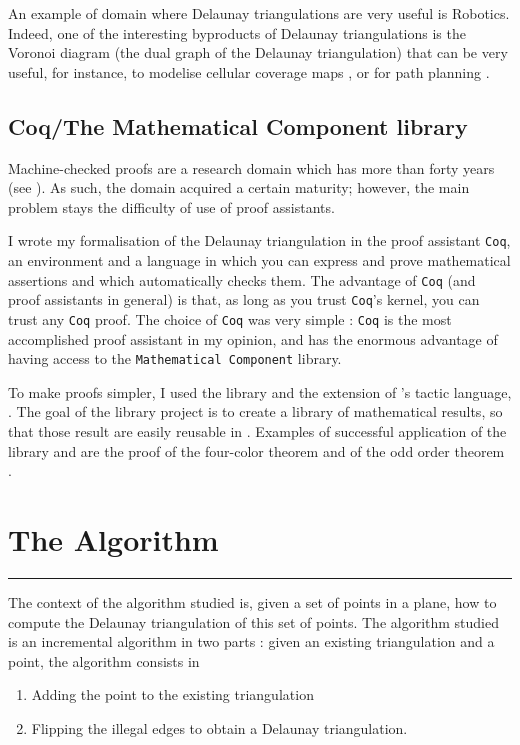 \documentclass[a4paper,10pt]{article}
\begin{document}
An example of domain where Delaunay triangulations are very useful is Robotics. Indeed, one of the interesting byproducts of Delaunay triangulations is the Voronoi diagram (the dual graph of the Delaunay triangulation) that can be very useful, for instance, to modelise cellular coverage maps \cite{CelCov}, or for path planning \cite{PathPla}.

\subsection{Coq/The Mathematical Component library}

Machine-checked proofs are a research domain which has more than forty years (see \cite{Automath}). As such, the domain acquired a certain maturity; however, the main problem stays the difficulty of use of proof assistants.

I wrote my formalisation of the Delaunay triangulation in the proof assistant {\tt Coq}, an environment and a language in which you can express and prove mathematical assertions and which automatically checks them. The advantage of {\tt Coq} (and proof assistants in general) is that, as long as you trust {\tt Coq}'s kernel, you can trust any {\tt Coq} proof. The choice of {\tt Coq} was very simple : {\tt Coq} is the most accomplished proof assistant in my opinion, and has the enormous advantage of having access to the {\tt Mathematical Component} library.

To make proofs simpler, I used the {} library and the extension of {}'s tactic language, {}. The goal of the {} library project is to create a library of mathematical results, so that those result are easily reusable in {}. Examples of successful application of the {} library and {} are the proof of the four-color theorem \cite{Gonthier08} and of the odd order theorem \cite{odd}.

\section{The Algorithm}
\label{algo}
\rule{\linewidth}{0.5pt}

The context of the algorithm studied is, given a set of points in a plane, how to compute the Delaunay triangulation of this set of points. The algorithm studied is an incremental algorithm in two parts : given an existing triangulation and a point, the algorithm consists in
\begin{enumerate}
\item Adding the point to the existing triangulation
\item Flipping the illegal edges to obtain a Delaunay triangulation.
\end{enumerate}
\end{document}

